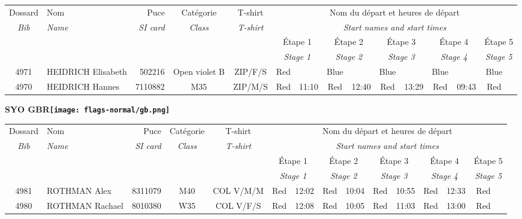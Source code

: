 \documentclass{report}
\begin{document}
  \begin{longtable}{|c|l|r|c|c|*{5}{cc|}}
    Dossard & Nom  & Puce    & Catégorie & T-shirt & \multicolumn{10}{c|}{Nom du départ et heures de départ} \\
    \itshape Bib     & \itshape Name & \itshape SI card & \itshape Class  & \itshape  T-shirt  & \multicolumn{10}{c|}{\itshape Start names and start times} \\
    \hline
    & & & & & \multicolumn{2}{c|}{Étape 1} & \multicolumn{2}{c|}{Étape 2} & \multicolumn{2}{c|}{Étape 3} & \multicolumn{2}{c|}{Étape 4} & \multicolumn{2}{c|}{Étape 5} \\
    & & & & & \multicolumn{2}{c|}{\itshape Stage 1} & \multicolumn{2}{c|}{\itshape Stage 2} & \multicolumn{2}{c|}{\itshape Stage 3} & \multicolumn{2}{c|}{\itshape Stage 4} & \multicolumn{2}{c|}{\itshape Stage 5} \\
    \hline
    4971 & HEIDRICH Elisabeth & 502216 & Open violet B & ZIP/F/S & Red &   & Blue &   & Blue &   & Blue &   & Blue &  \\
    4970 & HEIDRICH Hannes & 7110882 & M35 & ZIP/M/S & Red & 11:10 & Red & 12:40 & Red & 13:29 & Red & 09:43 & Red &  \\
  \end{longtable}
\newpage
  \Huge \centering \bfseries SYO  GBR\normalfont \footnotesize \sffamily \hfill \texttt{[image: flags-normal/gb.png]} \newline 
  \begin{longtable}{|c|l|r|c|c|*{5}{cc|}}
    Dossard & Nom  & Puce    & Catégorie & T-shirt & \multicolumn{10}{c|}{Nom du départ et heures de départ} \\
    \itshape Bib     & \itshape Name & \itshape SI card & \itshape Class  & \itshape  T-shirt  & \multicolumn{10}{c|}{\itshape Start names and start times} \\
    \hline
    & & & & & \multicolumn{2}{c|}{Étape 1} & \multicolumn{2}{c|}{Étape 2} & \multicolumn{2}{c|}{Étape 3} & \multicolumn{2}{c|}{Étape 4} & \multicolumn{2}{c|}{Étape 5} \\
    & & & & & \multicolumn{2}{c|}{\itshape Stage 1} & \multicolumn{2}{c|}{\itshape Stage 2} & \multicolumn{2}{c|}{\itshape Stage 3} & \multicolumn{2}{c|}{\itshape Stage 4} & \multicolumn{2}{c|}{\itshape Stage 5} \\
    \hline
    4981 & ROTHMAN Alex & 8311079 & M40 & COL V/M/M & Red & 12:02 & Red & 10:04 & Red & 10:55 & Red & 12:33 & Red &  \\
    4980 & ROTHMAN Rachael & 8010380 & W35 & COL V/F/S & Red & 12:08 & Red & 10:05 & Red & 11:03 & Red & 13:00 & Red &  \\
  \end{longtable}
\end{document}
